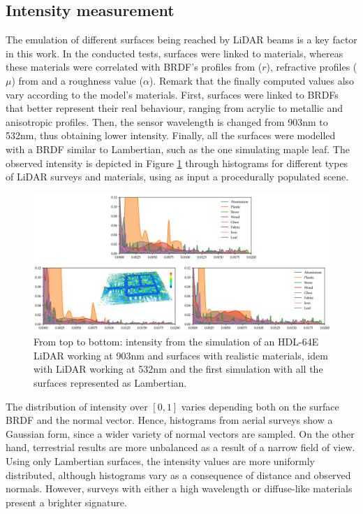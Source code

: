 \subsection{Intensity measurement}

The emulation of different surfaces being reached by LiDAR beams is a key factor in this work. In the conducted tests, surfaces were linked to materials, whereas these materials were correlated with BRDF's profiles from \cite{dupuy_adaptive_2018} ($r$), refractive profiles ($\mu$) from \cite{mikhail_n_polyanskiy_refractive_nodate} and a roughness value ($\alpha$). Remark that the finally computed values also vary according to the model's materials. First, surfaces were linked to BRDFs that better represent their real behaviour, ranging from acrylic to metallic and anisotropic profiles. Then, the sensor wavelength is changed from 903\si{\nano\meter} to 532\si{\nano\meter}, thus obtaining lower intensity. Finally, all the surfaces were modelled with a BRDF similar to Lambertian, such as the one simulating maple leaf. The observed intensity is depicted in Figure \ref{fig:database_intensity_results} through histograms for different types of LiDAR surveys and materials, using as input a procedurally populated scene.

\begin{figure}[ht]
	\centering
	\includegraphics[width=\linewidth]{figs/lidar_intensity/database_intensity_chart.png}
	\caption{From top to bottom: intensity from the simulation of an HDL-64E LiDAR working at 903\si{\nano\meter} and surfaces with realistic materials, idem with LiDAR working at 532\si{\nano\meter} and the first simulation with all the surfaces represented as Lambertian.}
	\label{fig:database_intensity_results}
\end{figure}

The distribution of intensity over $[0, 1]$ varies depending both on the surface BRDF and the normal vector. Hence, histograms from aerial surveys show a Gaussian form, since a wider variety of normal vectors are sampled. On the other hand, terrestrial results are more unbalanced as a result of a narrow field of view. Using only Lambertian surfaces, the intensity values are more uniformly distributed, although histograms vary as a consequence of distance and observed normals. However, surveys with either a high wavelength or diffuse-like materials present a brighter signature.

